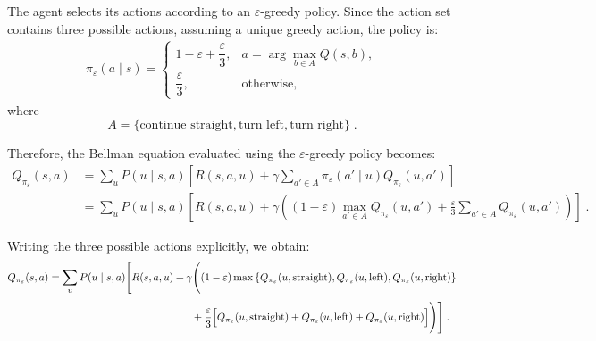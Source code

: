 \documentclass[12pt,a4paper]{article}
\begin{document}
The agent selects its actions according to an $\varepsilon$-greedy policy. Since the action set contains three possible actions, assuming a unique greedy action, the policy is:
\begin{align*}
	\pi_\varepsilon(a\mid s)
	=
	\begin{cases}
		1-\varepsilon+\dfrac{\varepsilon}{3},
		& \displaystyle a=\arg\max_{b\in A}Q(s,b), \\[10pt]
		\dfrac{\varepsilon}{3},
		& \text{otherwise},
	\end{cases}
\end{align*}
where
$$
A=\{\text{continue straight},\text{turn left},\text{turn right}\}\;.
$$

Therefore, the Bellman equation evaluated using the $\varepsilon$-greedy policy becomes:
\begin{align*}
	Q_{\pi_\varepsilon}(s,a)
	&=
	\sum_{u}P(u\mid s,a)
	\left[
	R(s,a,u)
	+
	\gamma
	\sum_{a'\in A}
	\pi_\varepsilon(a'\mid u)
	Q_{\pi_\varepsilon}(u,a')
	\right] \\[8pt]
	&=
	\sum_{u}P(u\mid s,a)
	\left[
	R(s,a,u)
	+
	\gamma
	\left(
	(1-\varepsilon)
	\max_{a'\in A}Q_{\pi_\varepsilon}(u,a')
	+
	\frac{\varepsilon}{3}
	\sum_{a'\in A}Q_{\pi_\varepsilon}(u,a')
	\right)
	\right]\;.
\end{align*}

Writing the three possible actions explicitly, we obtain:
\begin{align*}
	Q_{\pi_\varepsilon}(s,a)
	&=
	\sum_{u}P(u\mid s,a)
	\Bigg[
	R(s,a,u)
	+
	\gamma
	\Bigg(
	(1-\varepsilon)
	\max
	\left\{
	Q_{\pi_\varepsilon}(u,\text{straight}),
	Q_{\pi_\varepsilon}(u,\text{left}),
	Q_{\pi_\varepsilon}(u,\text{right})
	\right\} \\[4pt]
	&\hspace{4.8cm}
	+
	\frac{\varepsilon}{3}
	\Big[
	Q_{\pi_\varepsilon}(u,\text{straight})
	+
	Q_{\pi_\varepsilon}(u,\text{left})
	+
	Q_{\pi_\varepsilon}(u,\text{right})
	\Big]
	\Bigg)
	\Bigg]\;.
\end{align*}
\end{document}
